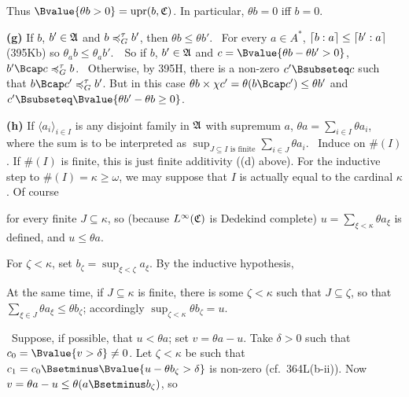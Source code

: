 {Thus $\Bvalue{\theta b>0}=\upr(b,\frak C)$.   In particular, $\theta
b=0$ iff $b=0$.

\medskip

{\bf (g)} If $b$, $b'\in\frak A$ and $b\preccurlyeq^{\tau}_G b'$, then
$\theta b\le\theta b'$.   \Prf\ For every $a\in A^*$,
$\lceil b:a\rceil\le\lceil b':a\rceil$ (395Kb) so
$\theta_ab\le\theta_ab'$.\ \Qed\   So if $b$, $b'\in\frak A$ and
$c=\Bvalue{\theta b-\theta b'>0}$, $b'\Bcap c\ptG b$.
\Prf\Quer\ Otherwise, by 395H, there is a non-zero $c'\Bsubseteq c$ such
that $b\Bcap c'\ptG b'$.   But in this case
$\theta b\times\chi c'=\theta(b\Bcap c')\le\theta b'$ and
$c'\Bsubseteq\Bvalue{\theta b'-\theta b\ge 0}$.\ \Bang\Qed

\medskip

{\bf (h)} If $\langle a_i\rangle_{i\in I}$ is any disjoint family in
$\frak A$ with supremum $a$,
$\theta a=\sum_{i\in I}\theta a_i$, where the sum is to be interpreted
as $\sup_{J\subseteq I\text{ is finite}}\sum_{i\in J}\theta a_i$.
\Prf\ Induce on $\#(I)$.   If $\#(I)$ is finite, this is just finite
additivity ((d) above).   For the inductive step to
$\#(I)=\kappa\ge\omega$, we may suppose that $I$ is actually equal to
the cardinal $\kappa$.   Of course


\noindent for every finite $J\subseteq\kappa$, so (because
$L^{\infty}(\frak C)$ is Dedekind complete)
$u=\sum_{\xi<\kappa}\theta a_{\xi}$ is defined, and $u\le\theta a$.

For $\zeta<\kappa$, set $b_{\zeta}=\sup_{\xi<\zeta}a_{\xi}$.   By the
inductive hypothesis,


\noindent At the same time, if $J\subseteq\kappa$ is finite, there is
some $\zeta<\kappa$ such that $J\subseteq\zeta$, so that
$\sum_{\xi\in J}\theta a_{\xi}\le\theta b_{\zeta}$;  accordingly
$\sup_{\zeta<\kappa}\theta b_{\zeta}=u$.

\Quer\ Suppose, if possible, that $u<\theta a$;  set $v=\theta a-u$.
Take $\delta>0$ such that $c_0=\Bvalue{v>\delta}\ne 0$.   Let
$\zeta<\kappa$ be such that
$c_1=c_0\Bsetminus\Bvalue{u-\theta b_{\zeta}>\delta}$ is
non-zero (cf.\ 364L(b-ii)).   Now
$v=\theta a-u\le\theta(a\Bsetminus b_{\zeta})$, so


}
